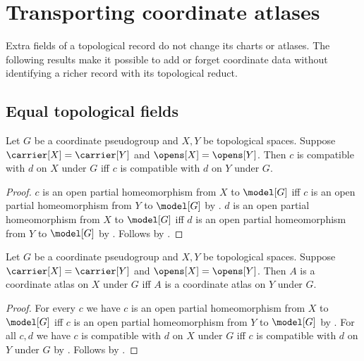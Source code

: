 \section{Transporting coordinate atlases}



Extra fields of a topological record do not change its charts or atlases.
The following results make it possible to add or forget coordinate data
without identifying a richer record with its topological reduct.

\subsection{Equal topological fields}

\begin{theorem}\label{coordinate_compatibility_same_fields}
    Let $G$ be a coordinate pseudogroup and $X,Y$ be topological spaces.
    Suppose $\carrier[X]=\carrier[Y]$ and $\opens[X]=\opens[Y]$.
    Then $c$ is compatible with $d$ on $X$ under $G$ iff
        $c$ is compatible with $d$ on $Y$ under $G$.
\end{theorem}
\begin{proof}
    $c$ is an open partial homeomorphism from $X$ to $\model[G]$ iff
        $c$ is an open partial homeomorphism from $Y$ to $\model[G]$ by
        .
    $d$ is an open partial homeomorphism from $X$ to $\model[G]$ iff
        $d$ is an open partial homeomorphism from $Y$ to $\model[G]$ by
        .
    Follows by .
\end{proof}

\begin{theorem}\label{coordinate_atlas_same_fields}
    Let $G$ be a coordinate pseudogroup and $X,Y$ be topological spaces.
    Suppose $\carrier[X]=\carrier[Y]$ and $\opens[X]=\opens[Y]$.
    Then $A$ is a coordinate atlas on $X$ under $G$ iff
        $A$ is a coordinate atlas on $Y$ under $G$.
\end{theorem}
\begin{proof}
    For every $c$ we have $c$ is an open partial homeomorphism from $X$ to $\model[G]$
        iff $c$ is an open partial homeomorphism from $Y$ to $\model[G]$ by
        .
    For all $c,d$ we have $c$ is compatible with $d$ on $X$ under $G$ iff
        $c$ is compatible with $d$ on $Y$ under $G$ by
        .
    Follows by .
\end{proof}

